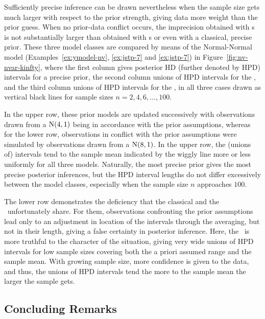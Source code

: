 \begin{example}
\label{ex:jstp-9}
Sufficiently precise inference can be drawn nevertheless when the sample
size gets much larger with respect to the prior strength, giving
data more weight than the prior guess. When no prior-data conflict
occurs, the imprecision obtained with \nymodel s is not
substantially larger than obtained with \ymodel s or even with a
classical, precise prior. These three model classes are compared by means
of the Normal-Normal model (Examples~\ref{ex:ymodel-nv}, \ref{ex:jstp-7} and \ref{ex:jstp-7})
in Figure~\ref{fig:nv-nvar-kinfty}, where the first
column gives posterior HD (further denoted by HPD) intervals for a
precise prior, the second column unions of HPD intervals for the
\ymodel, and the third column unions of HPD intervals for the
\nymodel, in all three cases drawn as vertical black lines for
sample sizes $n=2,4,6,\ldots,100$.

In the upper row, these prior models are updated successively with
observations drawn from a $\operatorname{N}(4,1)$ being in accordance with the prior assumptions,
whereas for the lower row, observations in conflict with the prior
assumptions were simulated by observations drawn from a $\operatorname{N}(8,1)$.
In the upper row, the (unions of)
intervals tend to the sample mean indicated by the wiggly line
more or less uniformly for all three models. Naturally, the most
precise prior gives the most precise posterior inferences, but the
HPD interval lengths do not differ excessively between the model classes, especially
when the sample size $n$ approaches $100$.

The lower row demonstrates the deficiency that the classical and
the \ymodel\ unfortunately share. For them, observations confronting
the prior assumptions lead only to an adjustment in location of
the intervals through the averaging, but not in their length, giving
a false certainty in posterior inference. Here, the \nymodel\ is
more truthful to the character of the situation, giving very wide
unions of HPD intervals for low sample sizes covering both the a priori
assumed range and the sample mean. With growing sample size, more
confidence is given to the data, and thus, the unions of HPD intervals
tend the more to the sample mean the larger the sample gets.
\end{example}


\subsection{Concluding Remarks}
\label{sec:6-gw-071216}

